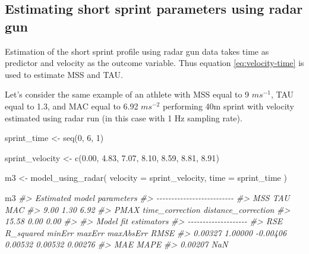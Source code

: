 \documentclass[fleqn,10pt,lineno]{wlpeerj} %
\newenvironment{Shaded}{\begin{snugshade}}{\end{snugshade}}
\newcommand{\AttributeTok}[1]{\textcolor[rgb]{0.77,0.63,0.00}{#1}}
\newcommand{\CommentTok}[1]{\textcolor[rgb]{0.56,0.35,0.01}{\textit{#1}}}
\newcommand{\DecValTok}[1]{\textcolor[rgb]{0.00,0.00,0.81}{#1}}
\newcommand{\FloatTok}[1]{\textcolor[rgb]{0.00,0.00,0.81}{#1}}
\newcommand{\FunctionTok}[1]{\textcolor[rgb]{0.00,0.00,0.00}{#1}}
\newcommand{\NormalTok}[1]{#1}
\newcommand{\OtherTok}[1]{\textcolor[rgb]{0.56,0.35,0.01}{#1}}
\begin{document}
\hypertarget{estimating-short-sprint-parameters-using-radar-gun}{%
\subsection{Estimating short sprint parameters using radar gun}\label{estimating-short-sprint-parameters-using-radar-gun}}

Estimation of the short sprint profile using radar gun data takes time as predictor and velocity as the outcome variable. Thus equation \eqref{eq:velocity-time} is used to estimate MSS and TAU.

Let's consider the same example of an athlete with MSS equal to 9 \(ms^{-1}\), TAU equal to 1.3, and MAC equal to 6.92 \(ms^{-2}\) performing 40m sprint with velocity estimated using radar run (in this case with 1 Hz sampling rate).

\begin{Shaded}
\begin{Highlighting}[]
\NormalTok{sprint\_time }\OtherTok{\textless{}{-}} \FunctionTok{seq}\NormalTok{(}\DecValTok{0}\NormalTok{, }\DecValTok{6}\NormalTok{, }\DecValTok{1}\NormalTok{)}

\NormalTok{sprint\_velocity }\OtherTok{\textless{}{-}} \FunctionTok{c}\NormalTok{(}\FloatTok{0.00}\NormalTok{, }\FloatTok{4.83}\NormalTok{, }\FloatTok{7.07}\NormalTok{, }\FloatTok{8.10}\NormalTok{, }\FloatTok{8.59}\NormalTok{, }\FloatTok{8.81}\NormalTok{, }\FloatTok{8.91}\NormalTok{)}

\NormalTok{m3 }\OtherTok{\textless{}{-}} \FunctionTok{model\_using\_radar}\NormalTok{(}
  \AttributeTok{velocity =}\NormalTok{ sprint\_velocity,}
  \AttributeTok{time =}\NormalTok{ sprint\_time}
\NormalTok{)}

\NormalTok{m3}
\CommentTok{\#\textgreater{} Estimated model parameters}
\CommentTok{\#\textgreater{} {-}{-}{-}{-}{-}{-}{-}{-}{-}{-}{-}{-}{-}{-}{-}{-}{-}{-}{-}{-}{-}{-}{-}{-}{-}{-}}
\CommentTok{\#\textgreater{}                 MSS                 TAU                 MAC }
\CommentTok{\#\textgreater{}                9.00                1.30                6.92 }
\CommentTok{\#\textgreater{}                PMAX     time\_correction distance\_correction }
\CommentTok{\#\textgreater{}               15.58                0.00                0.00 }
\CommentTok{\#\textgreater{} }
\CommentTok{\#\textgreater{} Model fit estimators}
\CommentTok{\#\textgreater{} {-}{-}{-}{-}{-}{-}{-}{-}{-}{-}{-}{-}{-}{-}{-}{-}{-}{-}{-}{-}}
\CommentTok{\#\textgreater{}       RSE R\_squared    minErr    maxErr maxAbsErr      RMSE }
\CommentTok{\#\textgreater{}   0.00327   1.00000  {-}0.00406   0.00532   0.00532   0.00276 }
\CommentTok{\#\textgreater{}       MAE      MAPE }
\CommentTok{\#\textgreater{}   0.00207       NaN}
\end{Highlighting}
\end{Shaded}
\end{document}
